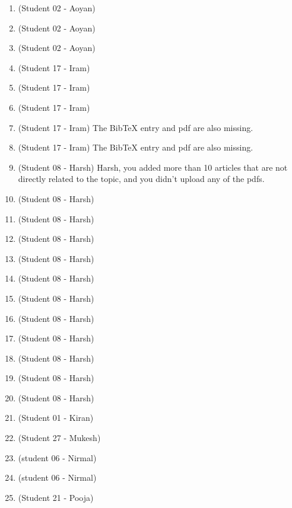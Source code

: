 \documentclass{article}
\begin{document}
\begin{enumerate}[label=R\arabic*,noitemsep,nolistsep]
\item \cite{qarkaxhija2022bruijn} (Student 02 - Aoyan)
\item \cite{li2026efficient} (Student 02 - Aoyan)
\item \cite{liu1990homomorphisms} (Student 02 - Aoyan)
\item \cite{barth1997parallel} (Student 17 - Iram)
\item \cite{sabbaghi20122d} (Student 17 - Iram)
\item \cite{bermond1994broadcasting} (Student 17 - Iram)
\item \cite{gabric2018constructing} (Student 17 - Iram)
The BibTeX entry and pdf are also missing.
\item \cite{sawada2016generalizing} (Student 17 - Iram)
The BibTeX entry and pdf are also missing.
\item \cite{games1983generalized} (Student 08 - Harsh)
Harsh, you added more than 10 articles that are not directly related to the topic, and you didn't upload any of the pdfs.
\item \cite{alhakim2011common} (Student 08 - Harsh)
\item \cite{games1983fast} (Student 08 - Harsh)
\item \cite{schwartz1999structure} (Student 08 - Harsh)
\item \cite{massey1969shift} (Student 08 - Harsh)
\item \cite{goresky2012algebraic} (Student 08 - Harsh)
\item \cite{debruijn1946combinatorial} (Student 08 - Harsh)
\item \cite{good1946normal} (Student 08 - Harsh)
\item \cite{golomb1967shift} (Student 08 - Harsh)
\item \cite{knuth2011art} (Student 08 - Harsh)
\item \cite{horan2012universal} (Student 08 - Harsh)
\item \cite{zeng2013class} (Student 08 - Harsh)
\item \cite{sawada2016surprisingly} (Student 01 - Kiran)
\item \cite{golomb1992periods} (Student 27 - Mukesh)
\item \cite{bingol2026bruijn} (student 06 - Nirmal)
\item \cite{li2014class} (student 06 - Nirmal)
\item \cite{etzion1986algorithm} (Student 21 - Pooja)

\end{enumerate}
\end{document}

